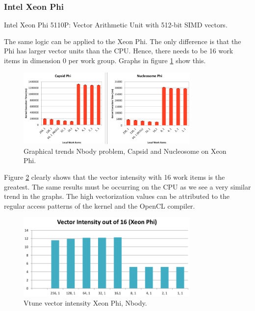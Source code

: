 \subsubsection{Intel Xeon Phi}
\par{{\color{red} Intel Xeon Phi 5110P: Vector Arithmetic Unit with 512-bit SIMD vectors.}}

\par{The same logic can be applied to the Xeon Phi. The only difference
    is that the Phi has larger vector units than the CPU. Hence, there needs 
    to be 16 work items in dimension 0 per work group. Graphs in figure \ref{nbody_phi} show this.}

\begin{figure}[!h]
    \centering
    \includegraphics[width=0.8\textwidth]{figures/nbody_phi.png}
    \caption{Graphical trends Nbody problem, Capsid and Nucleosome on Xeon Phi.}
    \label{nbody_phi}
\end{figure}

\par{Figure \ref{nbody_phi_vec} clearly shows that the vector intensity with 16 work items is the greatest. 
    The same results must be occurring on the CPU as we see a very similar trend in the graphs. 
    The high vectorization values can be attributed to the regular access patterns of the kernel 
    and the OpenCL compiler.}

\begin{figure}[!h]
    \centering
    \includegraphics[width=0.8\textwidth]{figures/nbody_phi_vec.png}
    \caption{Vtune vector intensity Xeon Phi, Nbody.}
    \label{nbody_phi_vec}
\end{figure}

